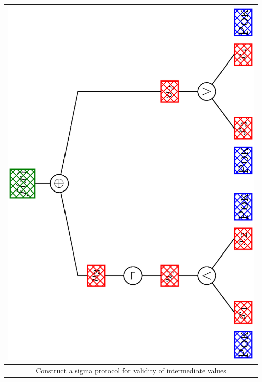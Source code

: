 \documentclass[landscape,footrule]{foils}
\begin{document}
\begin{center}
\begin{tabular}{|c|}
 \includegraphics[scale=0.18, angle=-90, clip, trim=3.0cm 0.0cm 3.5cm 0.0cm]{augmented-circuit-i}\\
\hline
 Construct a sigma protocol for validity of intermediate values\\ 

\end{tabular}
\end{center}
\end{document}
